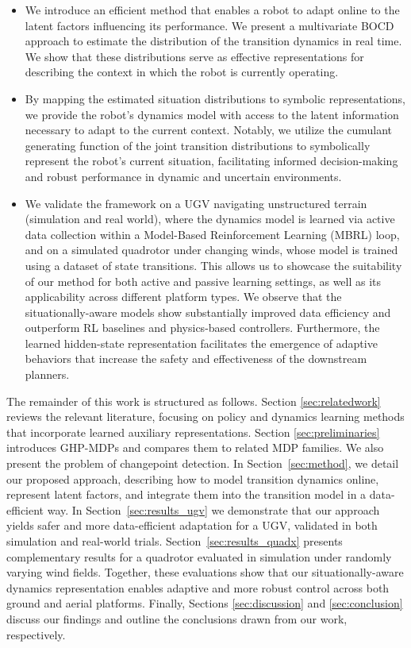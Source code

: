 \documentclass[Afour,sageh,times]{sagej}
\theoremstyle{lemma}
\begin{document}
 \begin{itemize}
\item 
 We introduce an efficient method that enables a robot to adapt online to the latent factors influencing its performance. We present a multivariate BOCD approach to estimate the distribution of the transition dynamics in real time. We show that these distributions serve as effective representations for describing the context in which the robot is currently operating. 
 \item 
 By mapping the estimated situation distributions to symbolic representations, we provide the robot’s dynamics model with access to the latent information necessary to adapt to the current context. Notably, we utilize the cumulant generating function of the joint transition distributions to symbolically represent the robot's current situation, facilitating informed decision-making and robust performance in dynamic and uncertain environments.

\item We validate the framework on a UGV navigating unstructured terrain (simulation and real world), where the dynamics model is learned via active data collection within a Model-Based Reinforcement Learning (MBRL) loop, and on a simulated quadrotor under changing winds, whose model is trained using a dataset of state transitions. This allows us to showcase the suitability of our method for both active and passive learning settings, as well as its applicability across different platform types. We observe that the situationally-aware models show substantially improved data efficiency and outperform RL baselines and physics-based controllers. Furthermore, the learned hidden-state representation facilitates the emergence of adaptive behaviors that increase the safety and effectiveness of the downstream planners.
 \end{itemize}

The remainder of this work is structured as follows. Section \ref{sec:relatedwork} reviews the relevant literature, focusing on policy and dynamics learning methods that incorporate learned auxiliary representations. Section \ref{sec:preliminaries} introduces GHP-MDPs and compares them to related MDP families. We also present the problem of changepoint detection. In Section~\ref{sec:method}, we detail our proposed approach, describing how to model transition dynamics online, represent latent factors, and integrate them into the transition model in a data-efficient way. In Section~\ref{sec:results_ugv} we demonstrate that our approach yields safer and more data-efficient adaptation for a UGV, validated in both simulation and real-world trials. Section~\ref{sec:results_quadx} presents complementary results for a quadrotor evaluated in simulation under randomly varying wind fields. Together, these evaluations show that our situationally-aware dynamics representation enables adaptive and more robust control across both ground and aerial platforms.
Finally, Sections \ref{sec:discussion} and \ref{sec:conclusion} discuss our findings and outline the conclusions drawn from our work, respectively.
\end{document}
